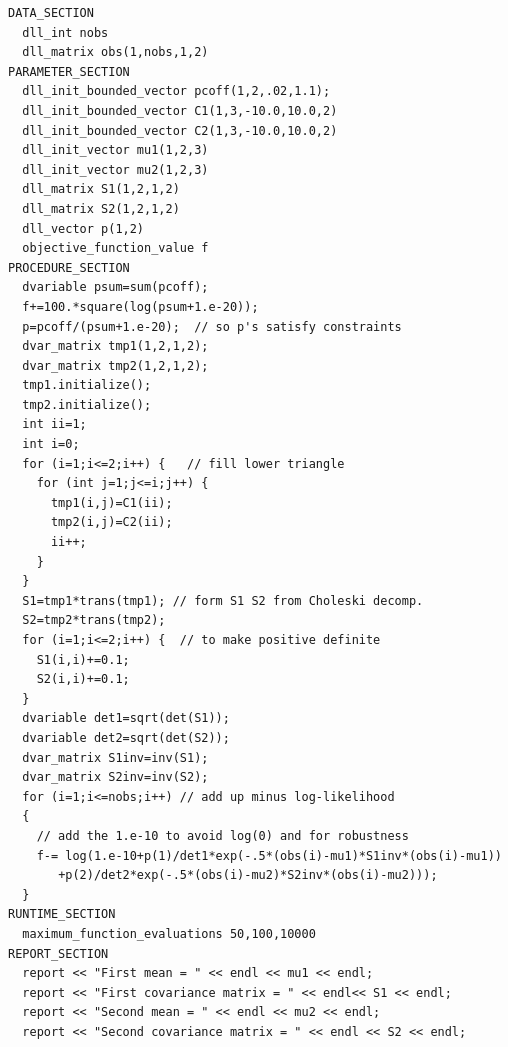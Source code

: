 \begin{lstlisting}
DATA_SECTION
  dll_int nobs
  dll_matrix obs(1,nobs,1,2) 
PARAMETER_SECTION
  dll_init_bounded_vector pcoff(1,2,.02,1.1);  
  dll_init_bounded_vector C1(1,3,-10.0,10.0,2)
  dll_init_bounded_vector C2(1,3,-10.0,10.0,2)
  dll_init_vector mu1(1,2,3)
  dll_init_vector mu2(1,2,3)
  dll_matrix S1(1,2,1,2)
  dll_matrix S2(1,2,1,2)
  dll_vector p(1,2)
  objective_function_value f
PROCEDURE_SECTION
  dvariable psum=sum(pcoff);
  f+=100.*square(log(psum+1.e-20));
  p=pcoff/(psum+1.e-20);  // so p's satisfy constraints
  dvar_matrix tmp1(1,2,1,2);
  dvar_matrix tmp2(1,2,1,2);
  tmp1.initialize();
  tmp2.initialize();
  int ii=1;
  int i=0;
  for (i=1;i<=2;i++) {   // fill lower triangle
    for (int j=1;j<=i;j++) { 
      tmp1(i,j)=C1(ii);
      tmp2(i,j)=C2(ii);
      ii++;
    }
  }
  S1=tmp1*trans(tmp1); // form S1 S2 from Choleski decomp.
  S2=tmp2*trans(tmp2);
  for (i=1;i<=2;i++) {  // to make positive definite
    S1(i,i)+=0.1; 
    S2(i,i)+=0.1;
  }
  dvariable det1=sqrt(det(S1));
  dvariable det2=sqrt(det(S2));
  dvar_matrix S1inv=inv(S1);
  dvar_matrix S2inv=inv(S2);
  for (i=1;i<=nobs;i++) // add up minus log-likelihood
  {
    // add the 1.e-10 to avoid log(0) and for robustness
    f-= log(1.e-10+p(1)/det1*exp(-.5*(obs(i)-mu1)*S1inv*(obs(i)-mu1))
       +p(2)/det2*exp(-.5*(obs(i)-mu2)*S2inv*(obs(i)-mu2)));
  }  
RUNTIME_SECTION
  maximum_function_evaluations 50,100,10000
REPORT_SECTION
  report << "First mean = " << endl << mu1 << endl;
  report << "First covariance matrix = " << endl<< S1 << endl;
  report << "Second mean = " << endl << mu2 << endl;
  report << "Second covariance matrix = " << endl << S2 << endl;
\end{lstlisting}

